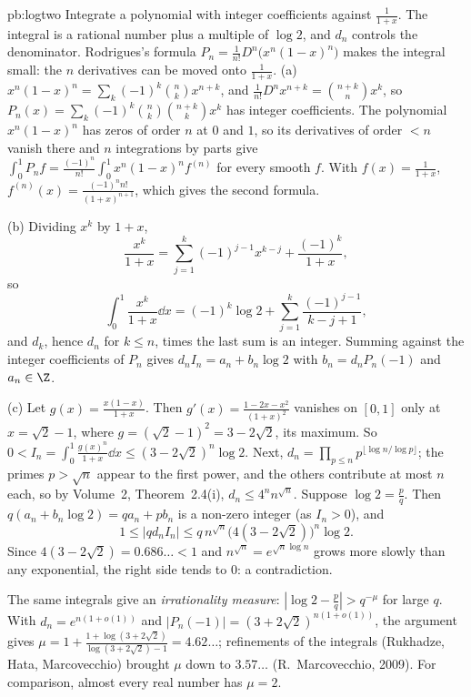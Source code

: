 \begin{solution}{pb:logtwo}
\idea Integrate a polynomial with integer coefficients against $\frac1{1+x}$. The integral is a rational number plus a multiple of $\log2$, and $d_n$ controls the denominator. Rodrigues's formula $P_n=\frac1{n!}D^n\bigl(x^n(1-x)^n\bigr)$ makes the integral small: the $n$ derivatives can be moved onto $\frac1{1+x}$.
\writeup (a) $x^n(1-x)^n=\sum_k(-1)^k\binom nkx^{n+k}$, and $\frac1{n!}D^nx^{n+k}=\binom{n+k}nx^k$, so $P_n(x)=\sum_k(-1)^k\binom nk\binom{n+k}kx^k$ has integer
coefficients. The polynomial $x^n(1-x)^n$ has zeros of order $n$ at $0$ and $1$, so its derivatives of order $<n$ vanish there and $n$
integrations by parts give $\int_0^1P_nf=\frac{(-1)^n}{n!}\int_0^1x^n(1-x)^nf^{(n)}$ for every smooth $f$. With $f(x)=\frac1{1+x}$,
$f^{(n)}(x)=\frac{(-1)^nn!}{(1+x)^{n+1}}$, which gives the second formula.

(b) Dividing $x^k$ by $1+x$,
\[
\frac{x^k}{1+x}=\sum_{j=1}^k(-1)^{j-1}x^{k-j}+\frac{(-1)^k}{1+x},
\]
so
\[
\int_0^1\frac{x^k}{1+x}\dd x=(-1)^k\log2+\sum_{j=1}^k\frac{(-1)^{j-1}}{k-j+1},
\]
and $d_k$, hence $d_n$ for $k\le n$, times the last sum is an integer. Summing against the integer coefficients of $P_n$ gives
$d_nI_n=a_n+b_n\log2$ with $b_n=d_nP_n(-1)$ and $a_n\in\Z$.

(c) Let $g(x)=\frac{x(1-x)}{1+x}$. Then $g'(x)=\frac{1-2x-x^2}{(1+x)^2}$ vanishes on $[0,1]$ only at $x=\sqrt2-1$, where $g=(\sqrt2-1)^2=3-2\sqrt2$, its
maximum. So $0<I_n=\int_0^1\frac{g(x)^n}{1+x}\dd x\le(3-2\sqrt2)^n\log2$. Next, $d_n=\prod_{p\le n}p^{\lfloor\log n/\log p\rfloor}$; the primes $p>\sqrt n$ appear
to the first power, and the others contribute at most $n$ each, so by Volume~2, Theorem~2.4(i), $d_n\le4^nn^{\sqrt n}$. Suppose
$\log2=\frac pq$. Then $q(a_n+b_n\log2)=qa_n+pb_n$ is a non-zero integer (as $I_n>0$), and
\[
1\le|qd_nI_n|\le q\,n^{\sqrt n}\bigl(4(3-2\sqrt2)\bigr)^n\log2.
\]
Since $4(3-2\sqrt2)=0.686\ldots<1$ and $n^{\sqrt n}=e^{\sqrt n\log n}$ grows more slowly than any exponential, the right side tends to $0$:
a contradiction.

\leads The same integrals give an \emph{irrationality measure}: $|\log2-\frac pq|>q^{-\mu}$ for large $q$. With $d_n=e^{n(1+o(1))}$ and
$|P_n(-1)|=(3+2\sqrt2)^{n(1+o(1))}$, the argument gives $\mu=1+\frac{1+\log(3+2\sqrt2)}{\log(3+2\sqrt2)-1}=4.62\ldots$; refinements of the integrals (Rukhadze, Hata, Marcovecchio) brought $\mu$ down to $3.57\ldots$ (R.~Marcovecchio,
2009). For comparison, almost every real number has $\mu=2$.
\end{solution}

